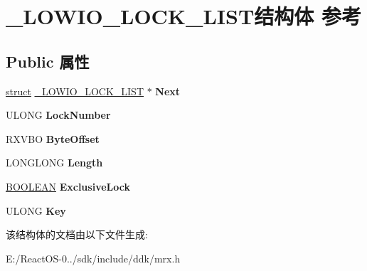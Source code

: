 \hypertarget{struct___l_o_w_i_o___l_o_c_k___l_i_s_t}{}\section{\+\_\+\+L\+O\+W\+I\+O\+\_\+\+L\+O\+C\+K\+\_\+\+L\+I\+S\+T结构体 参考}
\label{struct___l_o_w_i_o___l_o_c_k___l_i_s_t}
\subsection*{Public 属性}
\begin{DoxyCompactItemize}
\item 
\mbox{\label{struct___l_o_w_i_o___l_o_c_k___l_i_s_t_a3109cded4916fa9932b562bb8df4c3c7}} 
\hyperlink{interfacestruct}{struct} \hyperlink{struct___l_o_w_i_o___l_o_c_k___l_i_s_t}{\+\_\+\+L\+O\+W\+I\+O\+\_\+\+L\+O\+C\+K\+\_\+\+L\+I\+ST} $\ast$ {\bfseries Next}
\item 
\mbox{\label{struct___l_o_w_i_o___l_o_c_k___l_i_s_t_a05dfbb5037d69a8d8f3ff0361743e3ba}} 
U\+L\+O\+NG {\bfseries Lock\+Number}
\item 
\mbox{\label{struct___l_o_w_i_o___l_o_c_k___l_i_s_t_a78b015cbe1cf516e61b0e079ea89e96f}} 
R\+X\+V\+BO {\bfseries Byte\+Offset}
\item 
\mbox{\label{struct___l_o_w_i_o___l_o_c_k___l_i_s_t_a63bfad7969f325de595ee69881e205a1}} 
L\+O\+N\+G\+L\+O\+NG {\bfseries Length}
\item 
\mbox{\label{struct___l_o_w_i_o___l_o_c_k___l_i_s_t_a5ec1e33f4477996d92a52e297f89e4b3}} 
\hyperlink{_processor_bind_8h_a112e3146cb38b6ee95e64d85842e380a}{B\+O\+O\+L\+E\+AN} {\bfseries Exclusive\+Lock}
\item 
\mbox{\label{struct___l_o_w_i_o___l_o_c_k___l_i_s_t_a8f11e3a1c209cd319da1310b5d5e6c12}} 
U\+L\+O\+NG {\bfseries Key}
\end{DoxyCompactItemize}


该结构体的文档由以下文件生成\+:\begin{DoxyCompactItemize}
\item 
E\+:/\+React\+O\+S-\/0../sdk/include/ddk/mrx.\+h\end{DoxyCompactItemize}
